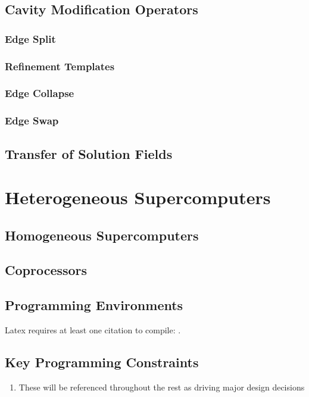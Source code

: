 \subsection{Cavity Modification Operators}

\subsubsection{Edge Split}

\subsubsection{Refinement Templates}

\subsubsection{Edge Collapse}

\subsubsection{Edge Swap}

\subsection{Transfer of Solution Fields}

\section{Heterogeneous Supercomputers}

\subsection{Homogeneous Supercomputers}

\subsection{Coprocessors}

\subsection{Programming Environments}

Latex requires at least one citation to
compile: \cite{edwards2013kokkos}.

\subsection{Key Programming Constraints}

\begin{enumerate}
\item These will be referenced throughout the rest
as driving major design decisions
\end{enumerate}


